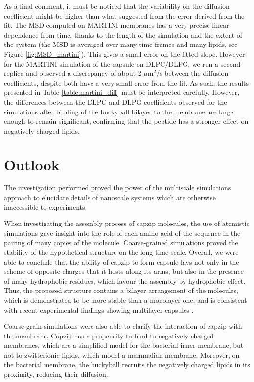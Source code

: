 As a final comment, it must be noticed that the variability on the diffusion coefficient might be higher than what suggested from the error derived from the fit. The MSD computed on MARTINI membranes has a very precise linear dependence from time, thanks to the length of the simulation and the extent of the system (the MSD is averaged over many time frames and many lipids, see Figure \ref{fig:MSD_martini}). This gives a small error on the fitted slope. However for the MARTINI simulation of the capsule on DLPC/DLPG, we run a second replica and observed a discrepancy of about 2 $\mu$m$^2$/s between the diffusion coefficients, despite both have a very small error from the fit.
%
As such, the results presented in Table \ref{table:martini_diff} must be interpreted carefully. However, the differences between the DLPC and DLPG coefficients observed for the simulations after binding of the buckyball bilayer to the membrane are large enough to remain significant, confirming that the peptide has a stronger effect on negatively charged lipids.


\section{Outlook}
The investigation performed proved the power of the multiscale simulations approach to elucidate details of nanoscale systems which are otherwise inaccessible to experiments.

When investigating the assembly process of capzip molecules, the use of atomistic simulations gave insight into the role of each amino acid of the sequence in the pairing of many copies of the molecule. Coarse-grained simulations proved the stability of the hypothetical structure on the long time scale. Overall, we were able to conclude that the ability of capzip to form capsule lays not only in the scheme of opposite charges that it hosts along its arms, but also in the presence of many hydrophobic residues, which favour the assembly by hydrophobic effect.
%
Thus, the proposed structure contains a bilayer arrangement of the molecules, which is demonstrated to be more stable than a monolayer one, and is consistent with recent experimental findings showing multilayer capsules \citep{Kepiro2019}.

Coarse-grain simulations were also able to clarify the interaction of capzip with the membrane. Capzip has a propensity to bind to negatively charged membranes, which are a simplified model for the bacterial inner membrane, but not to zwitterionic lipids, which model a mammalian membrane. Moreover, on the bacterial membrane, the buckyball recruits the negatively charged lipids in its proximity, reducing their diffusion.

